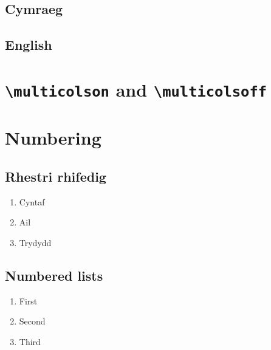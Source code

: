 \documentclass{article}
\begin{document}
\begin{multicols}

\begin{cymraeg}
\lipsum[1]
\end{cymraeg}

\begin{english}
\lipsum[2]
\end{english}

\mcsync %

\cym{\lipsum[5]}
\eng{\lipsum[6]}

\mcspan{\bigskip\lipsum[11]\bigskip} %

\begin{cymraeg}
\section{Cymraeg}
\lipsum[5]
\end{cymraeg}

\begin{english}
\section{English}
\lipsum[6]
\end{english}

\mcsync %

\cym{\lipsum[7]}
\eng{\lipsum[8]}

\cym{\lipsum[9]}
\eng{\lipsum[10]}

\end{multicols}

\section{{\tt\textbackslash multicolson} and {\tt\textbackslash multicolsoff}}

\multicolsoff
\begin{multicols}
\cym{\lipsum[11]}
\eng{\lipsum[12]}
\end{multicols}
\multicolson

\section{Numbering}

\begin{multicols}
%
\begin{cymraeg}
\subsection{Rhestri rhifedig}
\begin{enumerate}
\item Cyntaf
\item Ail
\item Trydydd
\end{enumerate}
\end{cymraeg}
%
\begin{english}
\subsection{Numbered lists}
\begin{enumerate}
\item First
\item Second
\item Third
\end{enumerate}
\end{english}
%
\end{multicols}
\end{document}

